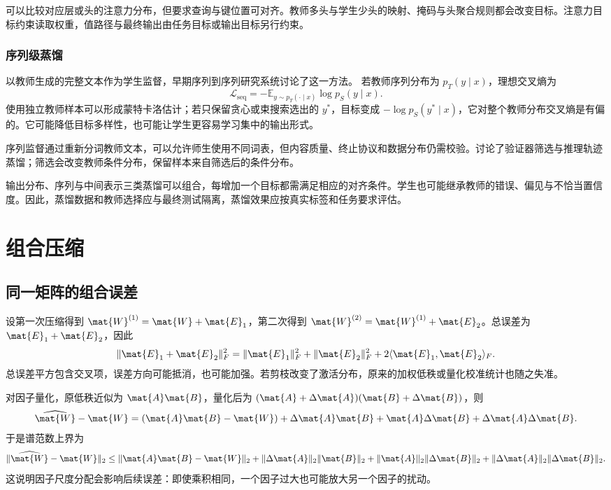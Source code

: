 \documentclass[../textbook.tex]{subfiles}
\begin{document}
可以比较对应层或头的注意力分布，但要求查询与键位置可对齐。教师多头与学生少头的映射、掩码与头聚合规则都会改变目标。注意力目标约束读取权重，值路径与最终输出由任务目标或输出目标另行约束。

\subsubsection{序列级蒸馏}
以教师生成的完整文本作为学生监督，早期序列到序列研究系统讨论了这一方法。\cite{kim2016sequencekd} 若教师序列分布为 $p_T(y\mid x)$，理想交叉熵为
\begin{equation}
 \mathcal L_{\mathrm{seq}}=-\mathbb E_{y\sim p_T(\cdot\mid x)}\log p_S(y\mid x).
\end{equation}
使用独立教师样本可以形成蒙特卡洛估计；若只保留贪心或束搜索选出的 $y^*$，目标变成 $-\log p_S(y^*\mid x)$，它对整个教师分布交叉熵是有偏的。它可能降低目标多样性，也可能让学生更容易学习集中的输出形式。

序列监督通过重新分词教师文本，可以允许师生使用不同词表，但内容质量、终止协议和数据分布仍需校验。讨论了验证器筛选与推理轨迹蒸馏；筛选会改变教师条件分布，保留样本来自筛选后的条件分布。

输出分布、序列与中间表示三类蒸馏可以组合，每增加一个目标都需满足相应的对齐条件。学生也可能继承教师的错误、偏见与不恰当置信度。因此，蒸馏数据和教师选择应与最终测试隔离，蒸馏效果应按真实标签和任务要求评估。

\section{组合压缩}

\subsection{同一矩阵的组合误差}
设第一次压缩得到 $\mat{W}^{(1)}=\mat{W}+\mat{E}_1$，第二次得到 $\mat{W}^{(2)}=\mat{W}^{(1)}+\mat{E}_2$。总误差为 $\mat{E}_1+\mat{E}_2$，因此
\begin{equation}
 \|\mat{E}_1+\mat{E}_2\|_F^2=\|\mat{E}_1\|_F^2+\|\mat{E}_2\|_F^2
 +2\langle \mat{E}_1,\mat{E}_2\rangle_F.
\end{equation}
总误差平方包含交叉项，误差方向可能抵消，也可能加强。若剪枝改变了激活分布，原来的加权低秩或量化校准统计也随之失准。

对因子量化，原低秩近似为 $\mat{A}\mat{B}$，量化后为 $(\mat{A}+\Delta \mat{A})(\mat{B}+\Delta \mat{B})$，则
\begin{equation}
 \widehat{\mat{W}}-\mat{W}=(\mat{A}\mat{B}-\mat{W})+\Delta \mat{A} \mat{B}+\mat{A}\Delta \mat{B}+\Delta \mat{A}\Delta \mat{B}.
\end{equation}
于是谱范数上界为
\begin{equation}
 \|\widehat{\mat{W}}-\mat{W}\|_2\leq\|\mat{A}\mat{B}-\mat{W}\|_2
 +\|\Delta \mat{A}\|_2\|\mat{B}\|_2+\|\mat{A}\|_2\|\Delta \mat{B}\|_2
 +\|\Delta \mat{A}\|_2\|\Delta \mat{B}\|_2.
\end{equation}
这说明因子尺度分配会影响后续误差：即使乘积相同，一个因子过大也可能放大另一个因子的扰动。
\end{document}
